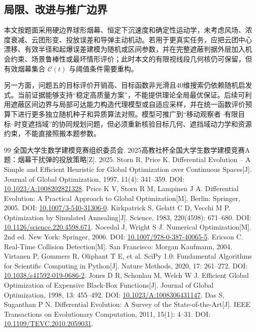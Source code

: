 \subsection{局限、改进与推广边界}
本文按题面采用硬边界球形烟幕、恒定下沉速度和确定性运动学，未考虑风场、浓度衰减、云团形变、投放误差和导弹主动机动。若用于更真实任务，应把云团中心漂移、有效半径和起爆误差建模为随机或区间参数，并在完整遮蔽判据外层加入机会约束、场景鲁棒性或最坏情形评价；此时本文的有限视线段几何核仍可保留，但有效烟幕集合 $\mathcal C(t)$ 与阈值条件需要重构。

另一方面，问题五的目标评价开销高、目标函数非光滑且40维搜索仍依赖随机启发式。当前证据能够支持“稳定高质量方案”，不能提供理论全局最优保证。后续可利用遮蔽区间边界与局部可达能力构造代理模型或自适应采样\cite{ref8}，并在统一函数评价预算下进行更多独立随机种子和异质算法对照。模型可推广到“移动观察者--有限目标--时变遮挡域”的协同规划问题，但必须重新核验目标几何、遮挡域动力学和资源约束，不能直接照搬本题参数。


\begin{thebibliography}{99}
 全国大学生数学建模竞赛组织委员会. 2025高教社杯全国大学生数学建模竞赛A题：烟幕干扰弹的投放策略[Z]. 2025.
 Storn R, Price K. Differential Evolution -- A Simple and Efficient Heuristic for Global Optimization over Continuous Spaces[J]. Journal of Global Optimization, 1997, 11(4): 341--359. DOI: \href{https://doi.org/10.1023/A:1008202821328}{10.1023/A:1008202821328}.
 Price K V, Storn R M, Lampinen J A. Differential Evolution: A Practical Approach to Global Optimization[M]. Berlin: Springer, 2005. DOI: \href{https://doi.org/10.1007/3-540-31306-0}{10.1007/3-540-31306-0}.
 Kirkpatrick S, Gelatt C D, Vecchi M P. Optimization by Simulated Annealing[J]. Science, 1983, 220(4598): 671--680. DOI: \href{https://doi.org/10.1126/science.220.4598.671}{10.1126/science.220.4598.671}.
 Nocedal J, Wright S J. Numerical Optimization[M]. 2nd ed. New York: Springer, 2006. DOI: \href{https://doi.org/10.1007/978-0-387-40065-5}{10.1007/978-0-387-40065-5}.
 Ericson C. Real-Time Collision Detection[M]. San Francisco: Morgan Kaufmann, 2004.
 Virtanen P, Gommers R, Oliphant T E, et al. SciPy 1.0: Fundamental Algorithms for Scientific Computing in Python[J]. Nature Methods, 2020, 17: 261--272. DOI: \href{https://doi.org/10.1038/s41592-019-0686-2}{10.1038/s41592-019-0686-2}.
 Jones D R, Schonlau M, Welch W J. Efficient Global Optimization of Expensive Black-Box Functions[J]. Journal of Global Optimization, 1998, 13: 455--492. DOI: \href{https://doi.org/10.1023/A:1008306431147}{10.1023/A:1008306431147}.
 Das S, Suganthan P N. Differential Evolution: A Survey of the State-of-the-Art[J]. IEEE Transactions on Evolutionary Computation, 2011, 15(1): 4--31. DOI: \href{https://doi.org/10.1109/TEVC.2010.2059031}{10.1109/TEVC.2010.2059031}.
\end{thebibliography}

